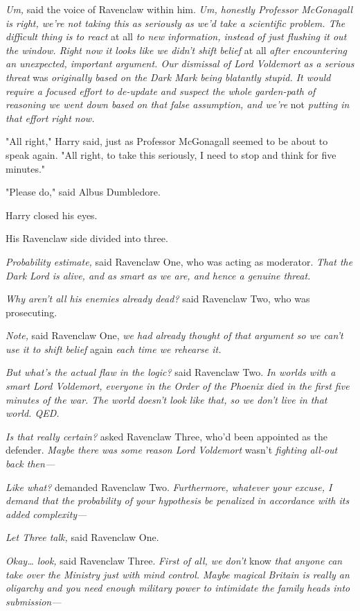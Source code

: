 \emph{Um,} said the voice of Ravenclaw within him. \emph{Um, honestly Professor
McGonagall is right, we're not taking this as seriously as we'd take a
scientific problem. The difficult thing is to react} at all \emph{to new
information, instead of just flushing it out the window. Right now it looks
like we didn't shift belief} at all \emph{after encountering an unexpected,
important argument. Our dismissal of Lord Voldemort as a serious threat}
was \emph{originally based on the Dark Mark being blatantly stupid. It would
require a focused effort to de-update and suspect the whole garden-path of
reasoning we went down based on that false assumption, and we're} not
\emph{putting in that effort right now.}

"All right," Harry said, just as Professor McGonagall seemed to be about to
speak again. "All right, to take this seriously, I need to stop and think for
five minutes."

"Please do," said Albus Dumbledore.

Harry closed his eyes.

His Ravenclaw side divided into three.

\emph{Probability estimate,} said Ravenclaw One, who was acting as moderator.
\emph{That the Dark Lord is alive, and as smart as we are, and hence a genuine
threat.}

\emph{Why aren't all his enemies already dead?} said Ravenclaw Two, who was
prosecuting.

\emph{Note,} said Ravenclaw One, \emph{we had already thought of that argument
so we can't use it to shift belief} again \emph{each time we rehearse it.}

\emph{But what's the actual flaw in the logic?} said Ravenclaw Two. \emph{In
worlds with a smart Lord Voldemort, everyone in the Order of the Phoenix died
in the first five minutes of the war. The world doesn't look like that, so we
don't live in that world. QED.}

\emph{Is that really certain?} asked Ravenclaw Three, who'd been appointed as
the defender. \emph{Maybe there was some reason Lord Voldemort} wasn't
\emph{fighting all-out back then---}

\emph{Like what?} demanded Ravenclaw Two. \emph{Furthermore, whatever your
excuse, I demand that the probability of your hypothesis be penalized in
accordance with its added complexity---}

\emph{Let Three talk,} said Ravenclaw One.

\emph{Okay{\ldots} look,} said Ravenclaw Three. \emph{First of all, we don't}
know \emph{that anyone can take over the Ministry just with mind control. Maybe
magical Britain is really an oligarchy and you need enough military power to
intimidate the family heads into submission---}

